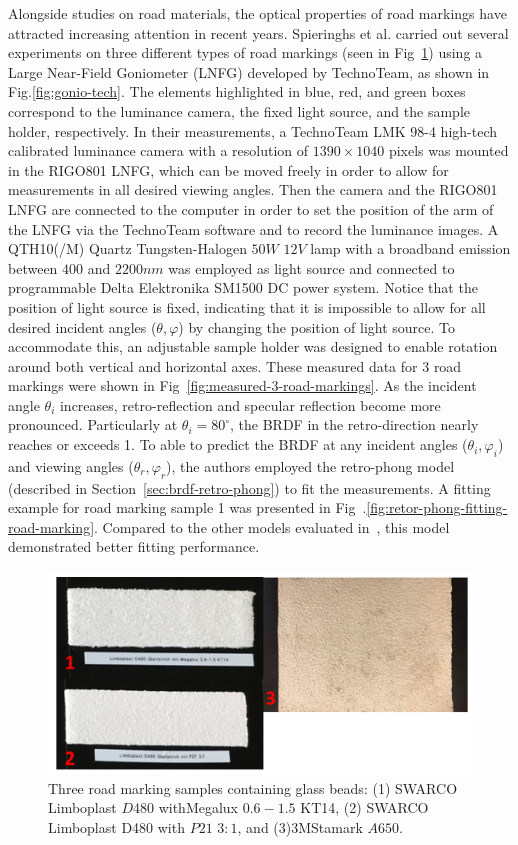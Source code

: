 Alongside studies on road materials, the optical properties of road markings have attracted increasing attention in recent years.
Spieringhs et al.\cite{2023_Spieringhs} carried out several experiments on three different types of road markings (seen in Fig~\ref{fig:3-road-markings}) using a Large Near-Field Goniometer (LNFG) developed by TechnoTeam, as shown in Fig.\ref{fig:gonio-tech}.
The elements highlighted in blue, red, and green boxes correspond to the luminance camera, the fixed light source, and the sample holder, respectively.
In their measurements, a TechnoTeam LMK 98-4 high-tech calibrated luminance camera with a resolution of $1390\times1040$ pixels was mounted in the RIGO801 LNFG, which can be moved freely in order to allow for measurements in all desired viewing angles.
Then the camera and the RIGO801 LNFG are connected to the computer in order to set the position of the arm of the LNFG via the TechnoTeam software and to record the luminance images.
A QTH10(/M) Quartz Tungsten-Halogen $50W$ $12V$ lamp with a broadband emission between $400$ and $2200 nm$ was employed as light source and connected to programmable Delta Elektronika SM1500 DC power system.
Notice that the position of light source is fixed, indicating that it is impossible to allow for all desired incident angles ($\theta, \varphi$) by changing the position of light source.
To accommodate this, an adjustable sample holder was designed to enable rotation around both vertical and horizontal axes.
These measured data for 3 road markings were shown  in Fig~\ref{fig:measured-3-road-markings}.
As the incident angle $\theta_i$ increases, retro-reflection and specular reflection become more pronounced.
Particularly at $\theta_i = 80^\circ$, the BRDF in the retro-direction nearly reaches or exceeds 1.
To able to predict the BRDF at any incident angles ($\theta_i, \varphi_i$) and viewing angles ($\theta_r, \varphi_r$), the authors employed the retro-phong model (described in Section~\eqref{sec:brdf-retro-phong}) to fit the measurements.
A fitting example for road marking sample 1 was presented in Fig~.\ref{fig:retor-phong-fitting-road-marking}.
Compared to the other models evaluated in~\cite{2023_Spieringhs}, this model demonstrated better fitting performance.

\begin{figure}[!tb]
    \centering
    \includegraphics[width=0.9\linewidth]{./figures/measurement-literature/3-road-markings.png}
    \caption{Three road marking samples containing glass beads: (1) SWARCO Limboplast $D480$ withMegalux $0.6-1.5$ KT14, (2) SWARCO Limboplast D480 with $P21$ $3:1$, and (3)3MStamark $A650$.}
    \label{fig:3-road-markings}
\end{figure}

